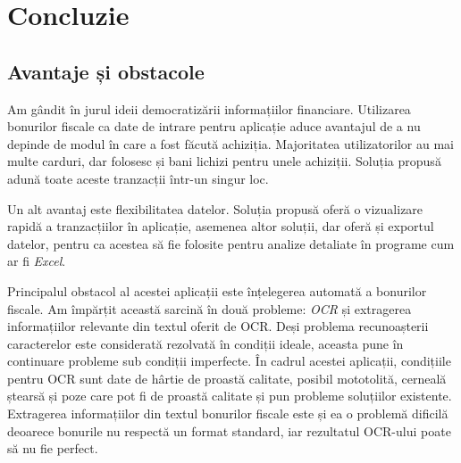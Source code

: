 \chapter{Concluzie}\label{conclusions}

\section{Avantaje și obstacole}\label{avantaje_obstacole_intro}

Am gândit \AppName{} în jurul ideii democratizării informațiilor financiare. Utilizarea bonurilor fiscale ca date de intrare pentru aplicație aduce avantajul de a nu depinde de modul în care a fost făcută achiziția. Majoritatea utilizatorilor au mai multe carduri, dar folosesc și bani lichizi pentru unele achiziții. Soluția propusă adună toate aceste tranzacții într-un singur loc.

Un alt avantaj este flexibilitatea datelor. Soluția propusă oferă o vizualizare rapidă a tranzacțiilor în aplicație, asemenea altor soluții, dar oferă și exportul datelor, pentru ca acestea să fie folosite pentru analize detaliate în programe cum ar fi \emph{Excel}.

Principalul obstacol al acestei aplicații este înțelegerea automată a bonurilor fiscale. Am împărțit această sarcină în două probleme: \emph{OCR} și extragerea informațiilor relevante din textul oferit de OCR. Deși problema recunoașterii caracterelor este considerată rezolvată în condiții ideale, aceasta pune în continuare probleme sub condiții imperfecte. În cadrul acestei aplicații, condițiile pentru OCR sunt date de hârtie de proastă calitate, posibil mototolită, cerneală ștearsă și poze care pot fi de proastă calitate și pun probleme soluțiilor existente. Extragerea informațiilor din textul bonurilor fiscale este și ea o problemă dificilă deoarece bonurile nu respectă un format standard, iar rezultatul OCR-ului poate să nu fie perfect. 
